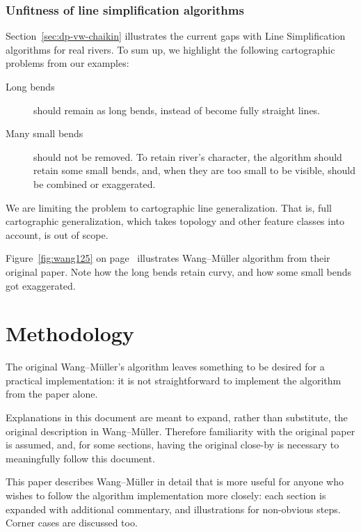 \documentclass[a4paper]{article}
\newcommand{\onpage}[1]{\ref{#1} on page~\pageref{#1}}
\newcommand{\WM}{Wang--M{\"u}ller}
\begin{document}
\subsubsection{Unfitness of line simplification algorithms}

Section~\ref{sec:dp-vw-chaikin} illustrates the current gaps with Line
Simplification algorithms for real rivers. To sum up, we highlight the
following cartographic problems from our examples:

\begin{description}

    \item[Long bends] should remain as long bends, instead of become fully
        straight lines.

    \item[Many small bends] should not be removed. To retain river's character,
        the algorithm should retain some small bends, and, when they are too
        small to be visible, should be combined or exaggerated.

\end{description}

We are limiting the problem to cartographic line generalization. That is, full
cartographic generalization, which takes topology and other feature classes
into account, is out of scope.

Figure~\onpage{fig:wang125} illustrates {\WM} algorithm from their original
paper. Note how the long bends retain curvy, and how some small bends got
exaggerated.

\section{Methodology}
\label{sec:methodology}

The original {\WM}'s algorithm \cite{wang1998line} leaves something to be
desired for a practical implementation: it is not straightforward to implement
the algorithm from the paper alone.

Explanations in this document are meant to expand, rather than substitute, the
original description in {\WM}. Therefore familiarity with the original paper is
assumed, and, for some sections, having the original close-by is necessary to
meaningfully follow this document.

This paper describes {\WM} in detail that is more useful for anyone who wishes
to follow the algorithm implementation more closely: each section is expanded
with additional commentary, and illustrations for non-obvious steps. Corner
cases are discussed too.
\end{document}
